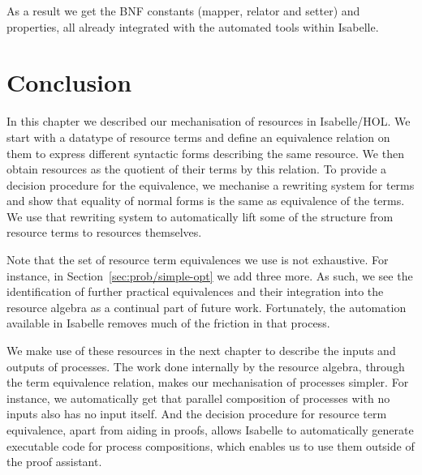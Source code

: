 \documentclass[class=smolathesis,crop=false]{standalone}
\begin{document}
As a result we get the BNF constants (mapper, relator and setter) and properties, all already integrated with the automated tools within Isabelle.

\section{Conclusion}
\label{sec:res/conc}

In this chapter we described our mechanisation of resources in Isabelle/HOL.
We start with a datatype of resource terms and define an equivalence relation on them to express different syntactic forms describing the same resource.
We then obtain resources as the quotient of their terms by this relation.
To provide a decision procedure for the equivalence, we mechanise a rewriting system for terms and show that equality of normal forms is the same as equivalence of the terms.
We use that rewriting system to automatically lift some of the structure from resource terms to resources themselves.

Note that the set of resource term equivalences we use is not exhaustive.
For instance, in Section~\ref{sec:prob/simple-opt} we add three more.
As such, we see the identification of further practical equivalences and their integration into the resource algebra as a continual part of future work.
Fortunately, the automation available in Isabelle removes much of the friction in that process.

We make use of these resources in the next chapter to describe the inputs and outputs of processes.
The work done internally by the resource algebra, through the term equivalence relation, makes our mechanisation of processes simpler.
For instance, we automatically get that parallel composition of processes with no inputs also has no input itself.
And the decision procedure for resource term equivalence, apart from aiding in proofs, allows Isabelle to automatically generate executable code for process compositions, which enables us to use them outside of the proof assistant.

\ifstandalone


\fi
\end{document}
